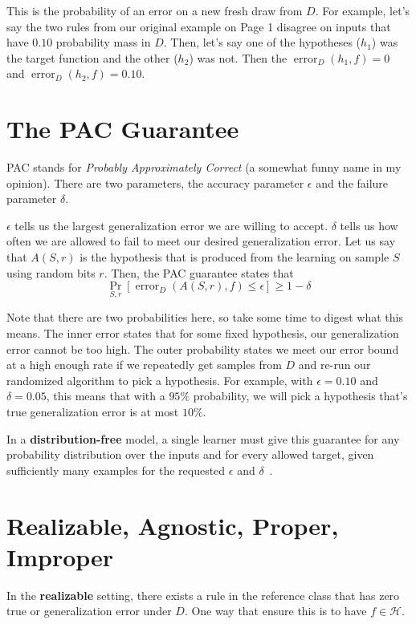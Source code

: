 \documentclass[11pt,fleqn]{article}
\newcommand{\Hy}{\mathcal H}
\newcommand{\err}{\operatorname{error}}
\newcommand{\eps}{\epsilon}
\begin{document}
This is the probability of an error on a new fresh draw from $D$. For example, let's say the two rules from our original example on Page 1 disagree on inputs that have $0.10$ probability mass in $D$. Then, let's say one of the hypotheses ($h_1$) was the target function and the other ($h_2$) was not. Then the $\err_D(h_1, f) = 0$ and $\err_D(h_2, f) = 0.10$.

\section{The PAC Guarantee}

PAC stands for \textit{Probably Approximately Correct} (a somewhat funny name in my opinion). There are two parameters, the accuracy parameter $\eps$ and the failure parameter $\delta$.\par

$\eps$ tells us the largest generalization error we are willing to accept. $\delta$ tells us how often we are allowed to fail to meet our desired generalization error. Let us say that $A(S, r)$ is the hypothesis that is produced from the learning on sample $S$ using random bits $r$. Then, the PAC guarantee states that
\[\boxed{\Pr_{S, r} [\err_D(A(S, r), f) \leq \eps] \geq 1 - \delta}\]

Note that there are two probabilities here, so take some time to digest what this means. The inner error states that for some fixed hypothesis, our generalization error cannot be too high. The outer probability states we meet our error bound at a high enough rate if we repeatedly get samples from $D$ and re-run our randomized algorithm to pick a hypothesis. For example, with $\eps = 0.10$ and $\delta = 0.05$, this means that with a $95\%$ probability, we will pick a hypothesis that's true generalization error is at most $10\%$.

In a \textbf{distribution-free} model, a single learner must give this guarantee for any probability distribution over the inputs and for every allowed target, given sufficiently many examples for the requested $\eps$ and $\delta$~\cite{kv}.

\section{Realizable, Agnostic, Proper, Improper}

In the \textbf{realizable} setting, there exists a rule in the reference class that has zero true or generalization error under $D$. One way that ensure this is to have $f \in \Hy$.\par
\end{document}
